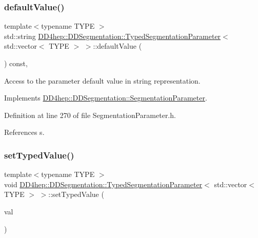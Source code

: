 \subsubsection{\texorpdfstring{default\+Value()}{defaultValue()}}
{\footnotesize\ttfamily template$<$typename T\+Y\+PE $>$ \\
std\+::string \hyperlink{class_d_d4hep_1_1_d_d_segmentation_1_1_typed_segmentation_parameter}{D\+D4hep\+::\+D\+D\+Segmentation\+::\+Typed\+Segmentation\+Parameter}$<$ std\+::vector$<$ T\+Y\+PE $>$ $>$\+::default\+Value (\begin{DoxyParamCaption}{ }\end{DoxyParamCaption}) const\hspace{0.3cm}{\ttfamily [inline]}, {\ttfamily [virtual]}}



Access to the parameter default value in string representation. 



Implements \hyperlink{class_d_d4hep_1_1_d_d_segmentation_1_1_segmentation_parameter_a2ef4dee84f8c9172aca49908c8fff136}{D\+D4hep\+::\+D\+D\+Segmentation\+::\+Segmentation\+Parameter}.



Definition at line 270 of file Segmentation\+Parameter.\+h.



References s.

\hypertarget{class_d_d4hep_1_1_d_d_segmentation_1_1_typed_segmentation_parameter_3_01std_1_1vector_3_01_t_y_p_e_01_4_01_4_ab26ff43253babc240b2f92ff02b59d3b}{}\label{class_d_d4hep_1_1_d_d_segmentation_1_1_typed_segmentation_parameter_3_01std_1_1vector_3_01_t_y_p_e_01_4_01_4_ab26ff43253babc240b2f92ff02b59d3b} 
\subsubsection{\texorpdfstring{set\+Typed\+Value()}{setTypedValue()}}
{\footnotesize\ttfamily template$<$typename T\+Y\+PE $>$ \\
void \hyperlink{class_d_d4hep_1_1_d_d_segmentation_1_1_typed_segmentation_parameter}{D\+D4hep\+::\+D\+D\+Segmentation\+::\+Typed\+Segmentation\+Parameter}$<$ std\+::vector$<$ T\+Y\+PE $>$ $>$\+::set\+Typed\+Value (\begin{DoxyParamCaption}\item[{const std\+::vector$<$ T\+Y\+PE $>$ \&}]{val }\end{DoxyParamCaption})\hspace{0.3cm}{\ttfamily [inline]}}



